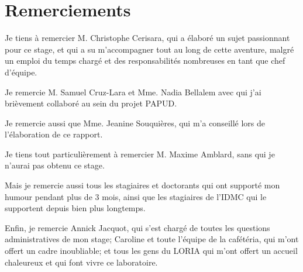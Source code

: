 \maketitle
{}
	
	
\makesecondtitle

\section*{Remerciements}
{
	Je tiens à remercier M. Christophe Cerisara, qui a élaboré un sujet passionnant pour ce stage, et qui a su m'accompagner tout au long de cette aventure, malgré un emploi du temps chargé et des responsabilités nombreuses en tant que chef d'équipe.
	
	Je remercie M. Samuel Cruz-Lara et Mme. Nadia Bellalem avec qui j'ai brièvement collaboré au sein du projet PAPUD. %
	
	Je remercie aussi que Mme. Jeanine Souquières, qui m'a conseillé lors de l'élaboration de ce rapport.
	
	Je tiens tout particulièrement à remercier 
	M. Maxime Amblard, sans qui je n'aurai pas obtenu ce stage.
	
	Mais je remercie aussi tous les stagiaires et doctorants qui ont supporté mon humour pendant plus de 3 mois, ainsi que les stagiaires de l'IDMC qui le supportent depuis bien plus longtemps.
	
	Enfin, je remercie Annick Jacquot, qui s'est chargé de toutes les questions administratives de mon stage; Caroline et toute l'équipe de la cafétéria, qui m'ont offert un cadre inoubliable; et tous les gens du LORIA qui m'ont offert un accueil chaleureux et qui font vivre ce laboratoire.
}


